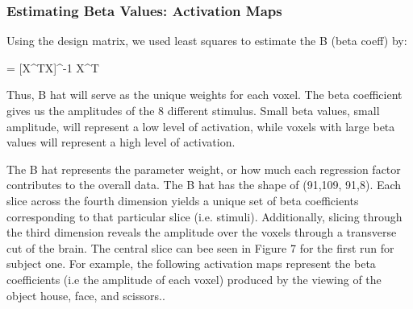 \documentclass[12pt]{article}
\begin{document}
\subsubsection{Estimating Beta Values: Activation Maps}
Using the design matrix, we used least squares to estimate the B (beta coeff) by:

     \hat{\beta }= [X^{T}X]^{-1} X^{T}

Thus, B hat will serve as the unique weights for each voxel. The beta 
coefficient gives us the amplitudes of the 8 different stimulus. Small beta values, small amplitude,
will represent a low level of activation, while voxels with large beta values will
represent a high level of activation.

The B hat represents the parameter weight, or how much each regression factor 
contributes to the overall data. The B hat has the shape of (91,109, 91,8). 
Each slice across the fourth dimension yields a unique set of beta coefficients 
corresponding to that particular slice (i.e. stimuli). Additionally, slicing 
through the third dimension reveals the amplitude over the voxels through a 
transverse cut of the brain. The central slice can bee seen in Figure 7 for the 
first run for subject one.
For example, the following activation maps represent the beta 
coefficients (i.e the amplitude of each voxel) produced by the viewing of the 
object house, face, and scissors..
\end{document}
